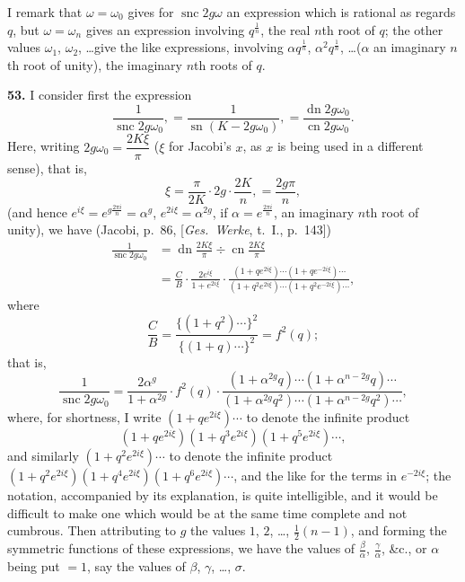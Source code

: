 \documentclass[12pt,a4paper]{article}
\DeclareMathOperator{\sn}{sn}
\DeclareMathOperator{\cn}{cn}
\DeclareMathOperator{\dn}{dn}
\DeclareMathOperator{\snc}{snc}
\begin{document}
I remark that $\omega = \omega_0$ gives for $\snc 2g\omega$ an expression which is rational as regards $q$, but $\omega = \omega_n$ gives an expression involving $q^{\frac{1}{n}}$, the real $n$th root of $q$; the other values $\omega_1$, $\omega_2$, \ldots give the like expressions, involving $\alpha q^{\frac{1}{n}}$, $\alpha^2 q^{\frac{1}{n}}$, \ldots ($\alpha$ an imaginary $n$th root of unity), the imaginary $n$th roots of $q$.

\textbf{53.} I consider first the expression
\[
\frac{1}{\snc 2g\omega_0}, = \frac{1}{\sn(K - 2g\omega_0)}, = \frac{\dn 2g\omega_0}{\cn 2g\omega_0}.
\]
Here, writing $2g\omega_0 = \dfrac{2K\xi}{\pi}$ ($\xi$ for Jacobi's $x$, as $x$ is being used in a different sense), that is,
\[
\xi = \frac{\pi}{2K} \cdot 2g \cdot \frac{2K}{n}, = \frac{2g\pi}{n},
\]
(and hence $e^{i\xi} = e^{g\frac{2\pi i}{n}} = \alpha^g$, $e^{2i\xi} = \alpha^{2g}$, if $\alpha = e^{\frac{2\pi i}{n}}$, an imaginary $n$th root of unity), we have (Jacobi, p.~86, [\textit{Ges.~Werke}, t.~I., p.~143])
\begin{align*}
\frac{1}{\snc 2g\omega_0}
&= \dn \frac{2K\xi}{\pi} \div \cn \frac{2K\xi}{\pi} \\
&= \frac{C}{B} \cdot \frac{2e^{i\xi}}{1 + e^{2i\xi}} \cdot
\frac{(1 + qe^{2i\xi}) \cdots (1 + qe^{-2i\xi}) \cdots}
{(1 + q^2 e^{2i\xi}) \cdots (1 + q^2 e^{-2i\xi}) \cdots},
\end{align*}
where
\[
\frac{C}{B} = \frac{\{(1 + q^2) \cdots\}^2}{\{(1 + q) \cdots\}^2} = f^2(q);
\]
that is,
\[
\frac{1}{\snc 2g\omega_0}
= \frac{2\alpha^g}{1 + \alpha^{2g}} \cdot f^2(q) \cdot
\frac{(1 + \alpha^{2g}q) \cdots (1 + \alpha^{n-2g}q) \cdots}
{(1 + \alpha^{2g}q^2) \cdots (1 + \alpha^{n-2g}q^2) \cdots},
\]
where, for shortness, I write $(1 + qe^{2i\xi}) \cdots$ to denote the infinite product
\[
(1 + qe^{2i\xi})(1 + q^3 e^{2i\xi})(1 + q^5 e^{2i\xi}) \cdots,
\]
and similarly $(1 + q^2 e^{2i\xi}) \cdots$ to denote the infinite product $(1 + q^2 e^{2i\xi})(1 + q^4 e^{2i\xi})(1 + q^6 e^{2i\xi}) \cdots$, and the like for the terms in $e^{-2i\xi}$; the notation, accompanied by its explanation, is quite intelligible, and it would be difficult to make one which would be at the same time complete and not cumbrous. Then attributing to $g$ the values $1$, $2$, \ldots, $\frac{1}{2}(n-1)$, and forming the symmetric functions of these expressions, we have the values of $\frac{\beta}{\alpha}$, $\frac{\gamma}{\alpha}$, \&c., or $\alpha$ being put $= 1$, say the values of $\beta$, $\gamma$, \ldots, $\sigma$.
\end{document}
